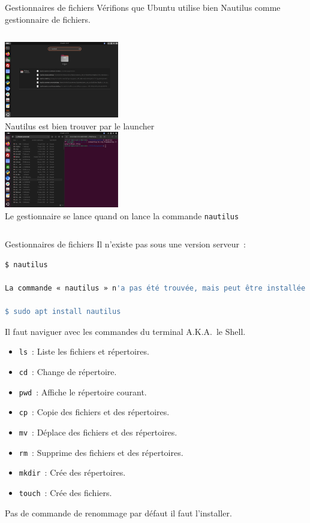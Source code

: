 \documentclass{beamer}
\begin{document}
    \begin{frame}{Gestionnaires de fichiers}
        Vérifions que Ubuntu utilise bien Nautilus comme gestionnaire de fichiers.
        \bigbreak
        \begin{columns}
            \centering
            \includegraphics[width=5cm]{image/nautilus-gui} \\ Nautilus est bien trouver par le launcher \\
            \centering
            \includegraphics[width=5cm]{image/nautilus-cli} \\ Le gestionnaire se lance quand on lance la commande \lstinline{nautilus} \\
        \end{columns}
    \end{frame}

    \begin{frame}[fragile]{Gestionnaires de fichiers}
        Il n'existe pas sous une version serveur~:
        \begin{lstlisting}[language=bash]
$ nautilus

La commande « nautilus » n'a pas été trouvée, mais peut être installée avec~:

$ sudo apt install nautilus
        \end{lstlisting}
        Il faut naviguer avec les commandes du terminal A.K.A.\ le Shell.
        \begin{itemize}
            \item \lstinline{ls}~: Liste les fichiers et répertoires.
            \item \lstinline{cd}~: Change de répertoire.
            \item \lstinline{pwd}~: Affiche le répertoire courant.
            \item \lstinline{cp}~: Copie des fichiers et des répertoires.
            \item \lstinline{mv}~: Déplace des fichiers et des répertoires.
            \item \lstinline{rm}~: Supprime des fichiers et des répertoires.
            \item \lstinline{mkdir}~: Crée des répertoires.
            \item \lstinline{touch}~: Crée des fichiers.
        \end{itemize}
        Pas de commande de renommage par défaut il faut l'installer.
    \end{frame}
\end{document}
